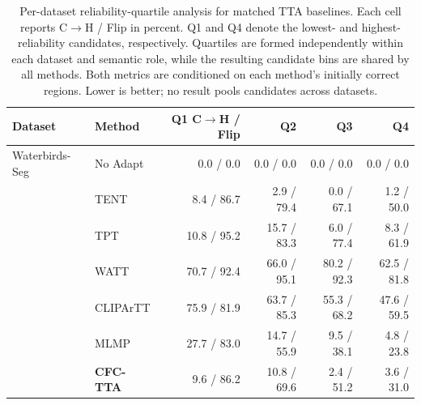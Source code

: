 \begin{table}[t]
\centering
\scriptsize
\setlength{\tabcolsep}{4pt}
\caption{Per-dataset reliability-quartile analysis for matched TTA baselines. Each cell reports C$\rightarrow$H / Flip in percent. Q1 and Q4 denote the lowest- and highest-reliability candidates, respectively. Quartiles are formed independently within each dataset and semantic role, while the resulting candidate bins are shared by all methods. Both metrics are conditioned on each method's initially correct regions. Lower is better; no result pools candidates across datasets.}
\label{tab:baseline-reliability-quartiles-per-dataset}
\begin{tabular}{llrrrr}
\toprule
Dataset & Method & Q1 C$\rightarrow$H / Flip & Q2 & Q3 & Q4 \\
\midrule
Waterbirds-Seg & No Adapt & 0.0 / 0.0 & 0.0 / 0.0 & 0.0 / 0.0 & 0.0 / 0.0 \\
 & TENT & 8.4 / 86.7 & 2.9 / 79.4 & 0.0 / 67.1 & 1.2 / 50.0 \\
 & TPT & 10.8 / 95.2 & 15.7 / 83.3 & 6.0 / 77.4 & 8.3 / 61.9 \\
 & WATT & 70.7 / 92.4 & 66.0 / 95.1 & 80.2 / 92.3 & 62.5 / 81.8 \\
 & CLIPArTT & 75.9 / 81.9 & 63.7 / 85.3 & 55.3 / 68.2 & 47.6 / 59.5 \\
 & MLMP & 27.7 / 83.0 & 14.7 / 55.9 & 9.5 / 38.1 & 4.8 / 23.8 \\
 & \textbf{CFC-TTA} & 9.6 / 86.2 & 10.8 / 69.6 & 2.4 / 51.2 & 3.6 / 31.0 \\
\bottomrule
\end{tabular}
\end{table}
